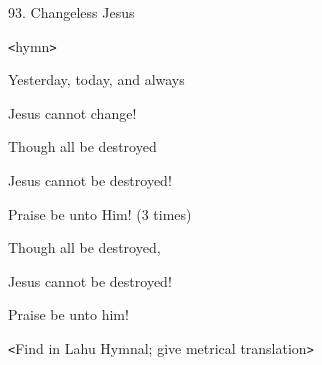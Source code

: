 
93. Changeless Jesus

\texttt{<}hymn\texttt{>}

Yesterday, today, and always

Jesus cannot change!

Though all be destroyed

Jesus cannot be destroyed!

Praise be unto Him! (3 times)

Though all be destroyed,

Jesus cannot be destroyed!

Praise be unto him!

\texttt{<}Find in Lahu Hymnal; give metrical translation\texttt{>}


